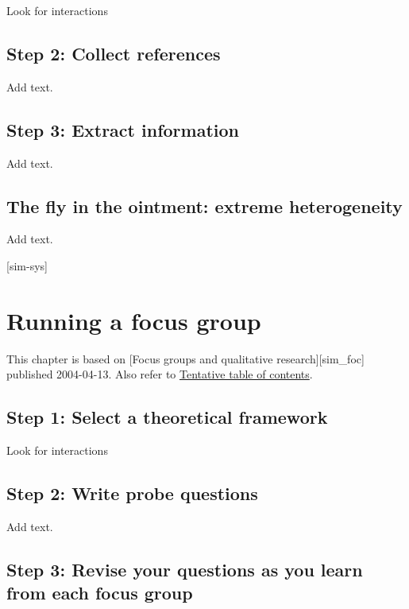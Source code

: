 \documentclass[
  letterpaper,
  DIV=11,
  numbers=noendperiod]{scrreprt}
\begin{document}
Look for interactions

\section{Step 2: Collect references}\label{step-2-collect-references}

Add text.

\section{Step 3: Extract information}\label{step-3-extract-information}

Add text.

\section{The fly in the ointment: extreme
heterogeneity}\label{the-fly-in-the-ointment-extreme-heterogeneity}

Add text.

{[}sim-sys{]}


\chapter{Running a focus group}\label{running-a-focus-group}

This chapter is based on {[}Focus groups and qualitative
research{]}{[}sim\_foc{]} published 2004-04-13. Also refer to
\href{http://www.pmean.com/10/Contents.html}{Tentative table of
contents}.

\section{Step 1: Select a theoretical
framework}\label{step-1-select-a-theoretical-framework}

Look for interactions

\section{Step 2: Write probe
questions}\label{step-2-write-probe-questions}

Add text.

\section{Step 3: Revise your questions as you learn from each focus
group}\label{step-3-revise-your-questions-as-you-learn-from-each-focus-group}
\end{document}
